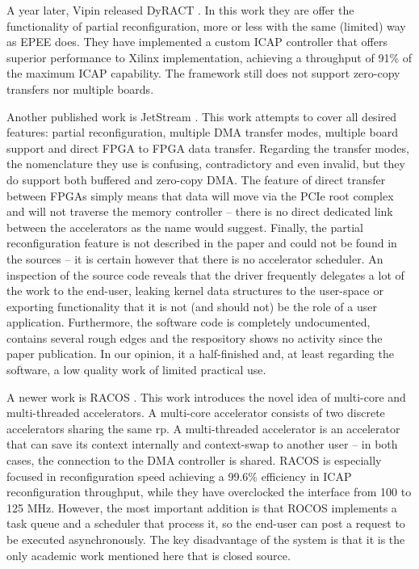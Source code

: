 A year later, Vipin released DyRACT \cite{dyract}.
In this work they are offer the functionality of partial reconfiguration, more or less with the same (limited) way as EPEE does.
They have implemented a custom ICAP controller that offers superior performance to Xilinx implementation,
achieving a throughput of 91\% of the maximum ICAP capability.
The framework still does not support zero-copy transfers nor multiple boards. 

Another published work is JetStream \cite{jetstream}. This work attempts to cover all desired features:
partial reconfiguration, multiple DMA transfer modes, multiple board support and direct FPGA to FPGA data transfer.
Regarding the transfer modes, the nomenclature they use is confusing, contradictory and even invalid,
but they do support both buffered and zero-copy DMA.
The feature of direct transfer between FPGAs simply means that data will move via the PCIe root complex 
and will not traverse the memory controller -- there is no
direct dedicated link between the accelerators as the name would suggest. 
Finally, the partial reconfiguration feature is not described in the paper and 
could not be found in the sources -- it is certain however that there is no accelerator scheduler.
An inspection of the source code reveals that the driver frequently delegates a lot of the work to the end-user,
leaking kernel data structures to the user-space or exporting functionality that it is not (and should not) be the role of a user application.
Furthermore, the software code is completely undocumented, 
contains several rough edges and the respository shows no activity since the paper publication.
In our opinion, it a half-finished and, at least regarding the software, a low quality work of limited practical use.

A newer work is RACOS \cite{racos}. This work introduces the novel idea of multi-core and multi-threaded accelerators.
A multi-core accelerator consists of two discrete accelerators sharing the same \gls{rp}. 
A multi-threaded accelerator is an accelerator that can save its context internally and 
context-swap to another user -- in both cases, the connection to the DMA controller is shared. 
RACOS is especially focused in reconfiguration speed achieving a 99.6\%
efficiency in ICAP reconfiguration throughput, while they have overclocked the interface from 100 to 125 MHz.
However, the most important addition is that ROCOS implements a task queue and a scheduler that process it,
so the end-user can post a request to be executed asynchronously. 
The key disadvantage of the system is that it is the only academic work mentioned here that is closed source.

